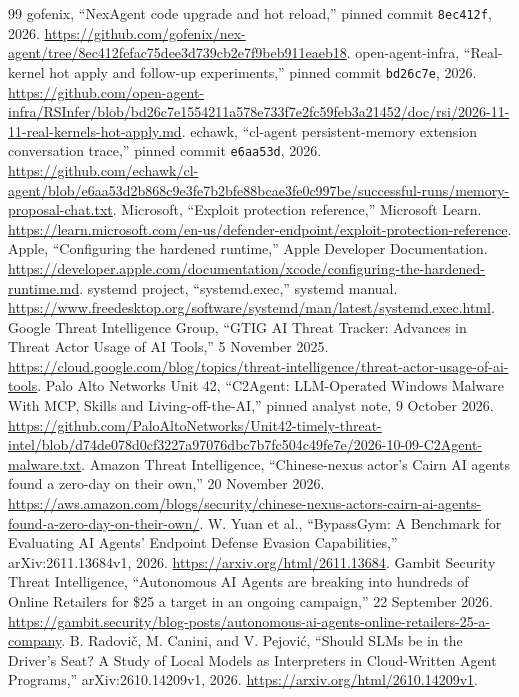 \documentclass[11pt,letterpaper]{article}
\begin{document}
\begin{thebibliography}{99}
 gofenix, ``NexAgent code upgrade and hot reload,'' pinned commit \texttt{8ec412f}, 2026. \url{https://github.com/gofenix/nex-agent/tree/8ec412fefac75dee3d739cb2e7f9beb911eaeb18}.
 open-agent-infra, ``Real-kernel hot apply and follow-up experiments,'' pinned commit \texttt{bd26c7e}, 2026. \url{https://github.com/open-agent-infra/RSInfer/blob/bd26c7e1554211a578e733f7e2fc59feb3a21452/doc/rsi/2026-11-11-real-kernels-hot-apply.md}.
 echawk, ``cl-agent persistent-memory extension conversation trace,'' pinned commit \texttt{e6aa53d}, 2026. \url{https://github.com/echawk/cl-agent/blob/e6aa53d2b868c9e3fe7b2bfe88bcae3fe0c997be/successful-runs/memory-proposal-chat.txt}.
 Microsoft, ``Exploit protection reference,'' Microsoft Learn. \url{https://learn.microsoft.com/en-us/defender-endpoint/exploit-protection-reference}.
 Apple, ``Configuring the hardened runtime,'' Apple Developer Documentation. \url{https://developer.apple.com/documentation/xcode/configuring-the-hardened-runtime.md}.
 systemd project, ``systemd.exec,'' systemd manual. \url{https://www.freedesktop.org/software/systemd/man/latest/systemd.exec.html}.
 Google Threat Intelligence Group, ``GTIG AI Threat Tracker: Advances in Threat Actor Usage of AI Tools,'' 5 November 2025. \url{https://cloud.google.com/blog/topics/threat-intelligence/threat-actor-usage-of-ai-tools}.
 Palo Alto Networks Unit 42, ``C2Agent: LLM-Operated Windows Malware With MCP, Skills and Living-off-the-AI,'' pinned analyst note, 9 October 2026. \url{https://github.com/PaloAltoNetworks/Unit42-timely-threat-intel/blob/d74de078d0cf3227a97076dbc7b7fc504c49fe7e/2026-10-09-C2Agent-malware.txt}.
 Amazon Threat Intelligence, ``Chinese-nexus actor's Cairn AI agents found a zero-day on their own,'' 20 November 2026. \url{https://aws.amazon.com/blogs/security/chinese-nexus-actors-cairn-ai-agents-found-a-zero-day-on-their-own/}.
 W. Yuan et al., ``BypassGym: A Benchmark for Evaluating AI Agents' Endpoint Defense Evasion Capabilities,'' arXiv:2611.13684v1, 2026. \url{https://arxiv.org/html/2611.13684}.
 Gambit Security Threat Intelligence, ``Autonomous AI Agents are breaking into hundreds of Online Retailers for \$25 a target in an ongoing campaign,'' 22 September 2026. \url{https://gambit.security/blog-posts/autonomous-ai-agents-online-retailers-25-a-company}.
 B. Radovi\v{c}, M. Canini, and V. Pejovi\'c, ``Should SLMs be in the Driver's Seat? A Study of Local Models as Interpreters in Cloud-Written Agent Programs,'' arXiv:2610.14209v1, 2026. \url{https://arxiv.org/html/2610.14209v1}.

\end{thebibliography}
\end{document}
